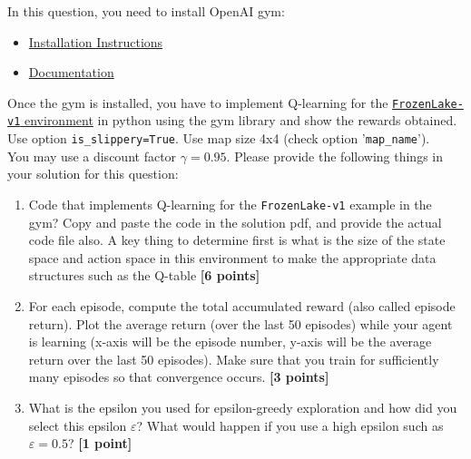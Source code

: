 \item In this question, you need to install OpenAI gym:
\begin{itemize}
  \item \href{https://github.com/openai/gym}{\color{blue}Installation Instructions}
  \item \href{https://www.gymlibrary.dev/content/basic_usage/}{\color{blue}Documentation}
\end{itemize}
Once the gym is installed, you have to implement Q-learning for the \href{https://www.gymlibrary.dev/environments/toy_text/frozen_lake/}{\color{blue}\lstinline{FrozenLake-v1}
  environment} in python using the gym library and show the rewards obtained. Use option \lstinline{is_slippery=True}. Use map size 4x4 (check option '\lstinline{map_name}').\\
You may use a discount factor $\gamma = 0.95$. Please provide the following things in your solution for this question:
\begin{enumerate}
  \item Code that implements Q-learning for the \lstinline{FrozenLake-v1} example in the gym? Copy and paste the code in the solution pdf, and provide the actual code file also. A key thing to determine first is what is the size of the state space and action space in this environment to make the appropriate data structures such as the Q-table \textbf{[6 points]}
  \item For each episode, compute the total accumulated reward (also called episode return). Plot the average return (over the last 50 episodes) while your agent is learning (x-axis will be the episode number, y-axis will be the average return over the last 50 episodes). Make sure that you train for sufficiently many episodes so that convergence occurs. \textbf{[3 points]}
  \item What is the epsilon you used for epsilon-greedy exploration and how did you select this epsilon $\varepsilon$? What would happen if you use a high epsilon such as $\varepsilon = 0.5$? \textbf{[1 point]}
\end{enumerate}
